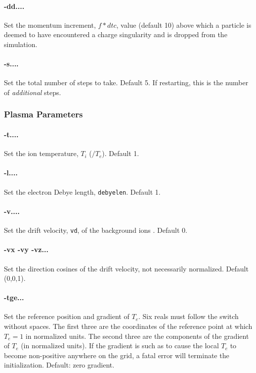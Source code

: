 \documentclass[12pt]{article}
\begin{document}
\paragraph{-dd....}
Set the momentum increment, $f*dtc$, value (default 10) above which a
particle is deemed to have encountered a charge singularity and is
dropped from the simulation.

\paragraph{-s....}
Set the total number of steps to take. Default 5. 
If restarting, this is the number of \emph{additional} steps. 

\subsubsection*{Plasma Parameters}

\paragraph{-t....}  Set the ion temperature, $T_i$ ($/T_e$). Default 1.

\paragraph{-l....}  Set the electron Debye length, \verb!debyelen!. Default 1.

\paragraph{-v....}  Set the drift velocity, \verb!vd!, of the background ions . Default 0.

\paragraph{-vx -vy -vz...} Set the direction cosines of the drift
velocity, not necessarily normalized. Default (0,0,1).

\paragraph{-tge...} Set the reference position and gradient of
$T_e$. Six reals must follow the switch without spaces. The first
three are the coordinates of the reference point at which $T_e=1$ in
normalized units. The second three are the components of the gradient
of $T_e$ (in normalized units). If the gradient is such as to cause
the local $T_e$ to become non-positive anywhere on the grid, a fatal
error will terminate the initialization. Default: zero gradient. 
\end{document}
